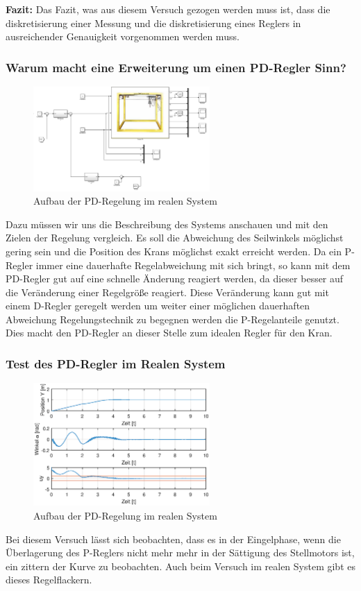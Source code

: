 \documentclass[10pt]{scrartcl}
\begin{document}
\textbf { Fazit:} Das Fazit, was aus diesem Versuch gezogen werden muss ist, dass die diskretisierung einer Messung und die diskretisierung eines Reglers in ausreichender Genauigkeit vorgenommen werden muss.
\subsubsection{Warum macht eine Erweiterung um einen PD-Regler Sinn?}
\begin{figure}[H]
	\centering
	\includegraphics[width=0.6\textwidth]{PDRegler.png}
	\caption{Aufbau der PD-Regelung im realen System}
	\label{img:grafik-dummy}
\end{figure}
Dazu müssen wir uns die Beschreibung des Systems anschauen und mit den Zielen der Regelung vergleich. Es soll die Abweichung des Seilwinkels möglichst gering sein und die Position des Krans möglichst exakt erreicht werden. Da ein P-Regler immer eine dauerhafte Regelabweichung mit sich bringt, so kann mit dem PD-Regler gut auf eine schnelle Änderung reagiert werden, da dieser besser auf die Veränderung einer Regelgröße reagiert. Diese Veränderung kann gut mit einem D-Regler geregelt werden um weiter einer möglichen dauerhaften Abweichung Regelungstechnik zu begegnen werden die P-Regelanteile genutzt. Dies macht den PD-Regler an dieser Stelle zum idealen Regler für den Kran.

\subsubsection{Test des PD-Regler im Realen System}
\begin{figure}[H]
	\centering
	\includegraphics[width=0.6\textwidth]{PD-ReglerTestReal}
	\caption{Aufbau der PD-Regelung im realen System}
	\label{img:grafik-dummy}
\end{figure}
Bei diesem Versuch lässt sich beobachten, dass es in der Eingelphase, wenn die Überlagerung des P-Reglers nicht mehr mehr in der Sättigung des Stellmotors ist, ein zittern der Kurve zu beobachten. Auch beim Versuch im realen System gibt es dieses Regelflackern.
\end{document}
